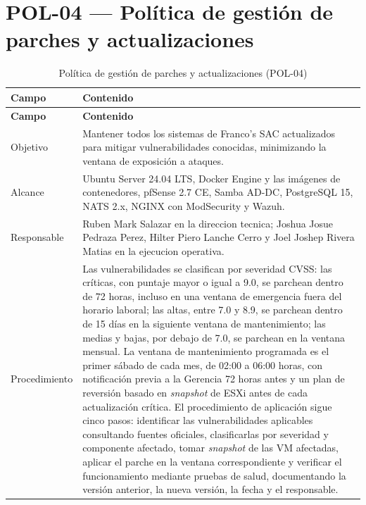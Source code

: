 \documentclass[11pt, a4paper, oneside]{report}
\begin{document}
\normalsize

\section{POL-04 — Política de gestión de parches y actualizaciones}

\renewcommand{\arraystretch}{1.3}
\footnotesize
{}

\begin{xltabular}{\textwidth}{@{}|L{2.6cm}|X|@{}}
\caption{Política de gestión de parches y actualizaciones (POL-04)}
\label{tab:pol04_parches} \\

\parbox[c][1.1cm][c]{\linewidth}{\centering\color{white}\bfseries\small Campo} &
\parbox[c][1.1cm][c]{\linewidth}{\centering\color{white}\bfseries\small Contenido} \\ \hline
\endfirsthead

\parbox[c][1.1cm][c]{\linewidth}{\centering\color{white}\bfseries\small Campo} &
\parbox[c][1.1cm][c]{\linewidth}{\centering\color{white}\bfseries\small Contenido} \\ \hline
\endhead

\hline
\endfoot

{\small Objetivo} & {\small Mantener todos los sistemas de Franco's SAC actualizados para mitigar vulnerabilidades conocidas, minimizando la ventana de exposición a ataques.} \\ \hline

{\small Alcance} & {\small Ubuntu Server 24.04 LTS, Docker Engine y las imágenes de contenedores, pfSense 2.7 CE, Samba AD-DC, PostgreSQL 15, NATS 2.x, NGINX con ModSecurity y Wazuh.} \\ \hline

{\small Responsable} & {\small Ruben Mark Salazar en la direccion tecnica; Joshua Josue Pedraza Perez, Hilter Piero Lanche Cerro y Joel Joshep Rivera Matias en la ejecucion operativa.} \\ \hline

{\small Procedimiento} & {\small Las vulnerabilidades se clasifican por severidad CVSS: las críticas, con puntaje mayor o igual a 9.0, se parchean dentro de 72 horas, incluso en una ventana de emergencia fuera del horario laboral; las altas, entre 7.0 y 8.9, se parchean dentro de 15 días en la siguiente ventana de mantenimiento; las medias y bajas, por debajo de 7.0, se parchean en la ventana mensual. La ventana de mantenimiento programada es el primer sábado de cada mes, de 02:00 a 06:00 horas, con notificación previa a la Gerencia 72 horas antes y un plan de reversión basado en \textit{snapshot} de ESXi antes de cada actualización crítica. El procedimiento de aplicación sigue cinco pasos: identificar las vulnerabilidades aplicables consultando fuentes oficiales, clasificarlas por severidad y componente afectado, tomar \textit{snapshot} de las VM afectadas, aplicar el parche en la ventana correspondiente y verificar el funcionamiento mediante pruebas de salud, documentando la versión anterior, la nueva versión, la fecha y el responsable.} \\ \hline


\end{xltabular}
\end{document}
